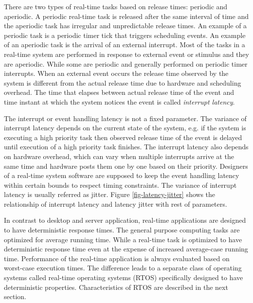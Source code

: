 There are two types of real-time tasks based on release times: periodic and aperiodic.
A periodic real-time task is released after the same interval of time and the aperiodic task has irregular and unpredictable release times.
An example of a periodic task is a periodic timer tick that triggers scheduling events.
An example of an aperiodic task is the arrival of an external interrupt.
Most of the tasks in a real-time system are performed in response to external event or stimulus and they are aperiodic.
While some are periodic and generally performed on periodic timer interrupts.
When an external event occurs the release time observed by the system is different from the actual release time due to hardware and scheduling overhead. 
The time that elapses between actual release time of the event and time instant at which the system notices the event is called \emph{interrupt latency}. 



The interrupt or event handling latency is not a fixed parameter. 
The variance of interrupt latency depends on the current state of the system, 
e.g. if the system is executing a high priority task then observed release time of the event is delayed until execution of a high priority task finishes. 
The interrupt latency also depends on hardware overhead, which can vary when multiple interrupts arrive at the same time and hardware posts them one by one based on their priority.
Designers of a real-time system software are supposed to keep the event handling latency within certain bounds to respect timing constraints. 
The variance of interrupt latency is usually referred as jitter. Figure \ref{fig-latency-jitter} shows the relationship of interrupt latency and latency jitter with rest of parameters.

In contrast to desktop and server application, real-time applications are designed to have deterministic response times.
The general purpose computing tasks are optimized for average running time. 
While a real-time task is optimized to have deterministic response time even at the expense of increased average-case running time.
Performance of the real-time application is always evaluated based on worst-case execution times.
The difference leads to a separate class of operating systems called real-time operating systems (RTOS) specifically designed to have deterministic properties.
Characteristics of RTOS are described in the next section.


